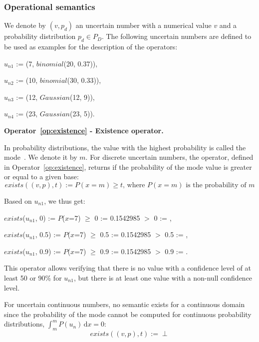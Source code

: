 \subsubsection{Operational semantics}
We denote by $(v, p_d)$ an uncertain number with a numerical value $v$ and a probability distribution $p_d \in P_D$.
The following uncertain numbers are defined to be used as examples for the description of the operators:
\begin{itemize*}
    \item[] $u_{n1}$ := (7, $binomial$(20, 0.37)),
    \item[] $u_{n2}$ := (10, $binomial$(30, 0.33)),
    \item[] $u_{n3}$ := (12, $Gaussian$(12, 9)),
    \item[] $u_{n4}$ := (23, $Gaussian$(23, 5)).
\end{itemize*}

\bigskip

\noindent\textbf{Operator~\ref{op:existence} - Existence operator.~}

In probability distributions, the value with the highest probability is called the mode~\cite{mood1963introduction}.
We denote it by $m$.
For discrete uncertain numbers, the operator, defined in Operator~\ref{op:existence}, returns \true{} if the probability of the mode value is greater or equal to a given base:
$$exists((v, p), t) := P(x=m)\geqslant t \text{, where $P(x=m)$ is the probability of $m$}$$

Based on $u_{n1}$, we thus get:
\begin{itemize*}
    \item[] $exists$($u_{n1}$, 0) := $P$($x$=7) $\geqslant$ 0 := 0.1542985 $>$ 0 := \true{},
    \item[] $exists$($u_{n1}$, 0.5) := $P$($x$=7) $\geqslant$ 0.5 := 0.1542985 $>$ 0.5 := \false{},
    \item[] $exists$($u_{n1}$, 0.9) := $P$($x$=7) $\geqslant$ 0.9 := 0.1542985 $>$ 0.9 := \false{}.
\end{itemize*}
This operator allows verifying that there is no value with a confidence level of at least 50 or 90\% for $u_{n1}$, but there is at least one value with a non-null confidence level.

For uncertain continuous numbers, no semantic exists for a continuous domain since the probability of the mode cannot be computed for continuous probability distributions, $\int_{m}^{m} P(u_n)\,\mathrm{d}x = 0$: 
$$exists((v, p), t) := \perp$$

